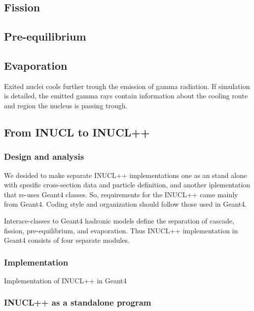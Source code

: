 \subsection{Fission}

\subsection{Pre-equilibrium}

\subsection{Evaporation}
Exited nuclei cools further trough the emission of gamma radiation.
If simulation is detailed,
the emitted gamma rays contain information about the cooling route 
and region the nucleus is passing trough.

\subsection{From INUCL to INUCL++}

\subsubsection{Design and analysis}
We desided to make separate INUCL++ implementations one as an stand
alone with spesific cross-section data and particle definition, and
another iplementation that re-uses Geant4 classes.
So, requirements for the INUCL++ came mainly from Geant4.
Coding style and organization should follow those used in Geant4.


Interace-classes to Geant4 hadronic models define the separation of
cascade, fission, pre-equilibrium, and evaporation. Thus INUCL++
implementation in Geant4 consists of four separate modules.

\subsubsection{Implementation}
Implementation of INUCL++ in {\sc Geant4}

\subsubsection{INUCL++ as a standalone program}
